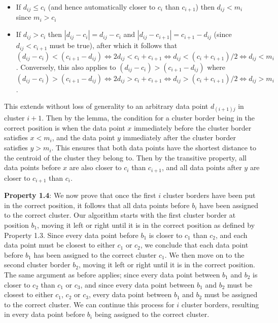 \documentclass[conference,compsoc]{IEEEtran}
\begin{document}
\begin{itemize}
    \item If $d_{ij} \leq c_i$ (and hence automatically closer to $c_i$ than $c_{i+1}$) then $d_{ij} < m_i$ since $m_i > c_i$
    \item If $d_{ij} > c_i$ then $|d_{ij} - c_i| = d_{ij} - c_i$ and $|d_{ij} - c_{i+1}| = c_{i+1}-d_{ij}$ (since $d_{ij} < c_{i+1}$ must be true), after which it follows that $(d_{ij}-c_i) < (c_{i+1}-d_{ij}) \iff 2d_{ij} < c_i+c_{i+1} \iff d_{ij} < (c_i+c_{i+1})/2 \iff d_{ij} < m_i$. Conversely, this also applies to $(d_{ij}-c_i) > (c_{i+1}-d_{ij})$ where $(d_{ij}-c_i) > (c_{i+1}-d_{ij}) \iff 2d_{ij} > c_i+c_{i+1} \iff d_{ij} > (c_i+c_{i+1})/2 \iff d_{ij} > m_i$.
\end{itemize}

This extends without loss of generality to an arbitrary data point $d_{(i+1)j}$ in cluster $i+1$. Then by the lemma, the condition for a cluster border being in the correct position is when the data point $x$ immediately before the cluster border satisfies $x < m_i$, and the data point $y$ immediately after the cluster border satisfies $y > m_i$. This ensures that both data points have the shortest distance to the centroid of the cluster they belong to. Then by the transitive property, all data points before $x$ are also closer to $c_i$ than $c_{i+1}$, and all data points after $y$ are closer to $c_{i+1}$ than $c_i$.

\textbf{Property 1.4}: We now prove that once the first $i$ cluster borders have been put in the correct position, it follows that all data points before $b_i$ have been assigned to the correct cluster. Our algorithm starts with the first cluster border at position $b_1$, moving it left or right until it is in the correct position as defined by Property 1.3. Since every data point before $b_1$ is closer to $c_1$ than $c_2$, and each data point must be closest to either $c_1$ or $c_2$, we conclude that each data point before $b_1$ has been assigned to the correct cluster $c_1$. We then move on to the second cluster border $b_2$, moving it left or right until it is in the correct position. The same argument as before applies; since every data point between $b_1$ and $b_2$ is closer to $c_2$ than $c_1$ or $c_3$, and since every data point between $b_1$ and $b_2$ must be closest to either $c_1$, $c_2$ or $c_3$, every data point between $b_1$ and $b_2$ must be assigned to the correct cluster. We can continue this process for $i$ cluster borders, resulting in every data point before $b_i$ being assigned to the correct cluster.
\end{document}

